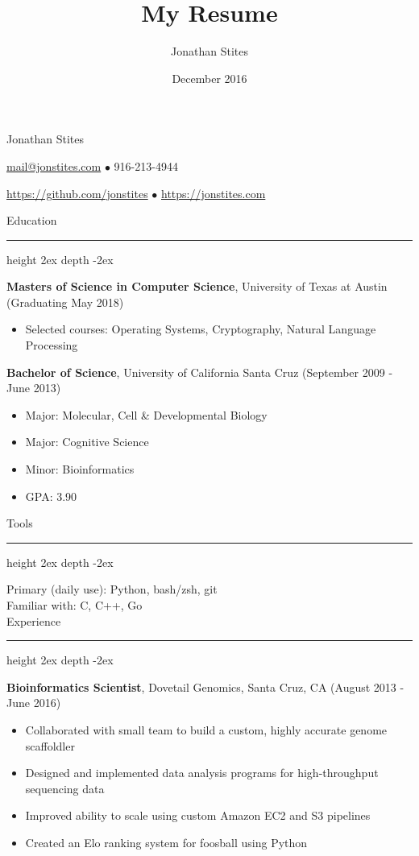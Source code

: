 \documentclass[12pt]{article}
\title{My Resume}
\author{Jonathan Stites}
\date{December 2016}
\newcommand\sectionline{\par\leavevmode\leaders\hrule height 2ex depth \dimexpr0.4pt-2ex\hfill\kern0pt\par}
\begin{document}
\begin{center}
{\LARGE Jonathan Stites}

{\href{mailto:mail+resume@jonstites.com}{mail@jonstites.com}}
$\bullet$
916-213-4944

{\href{https://github.com/jonstites}{https://github.com/jonstites}}
$\bullet$
{\href{https://jonstites.com}{https://jonstites.com}}
\end{center}

{\Large Education}\sectionline

\textbf{Masters of Science in Computer Science}, University of Texas at Austin (Graduating May 2018)
\begin{itemize}    
\setlength{\itemindent}{2em}
    \item[] Selected courses: Operating Systems, Cryptography, Natural Language Processing
\end{itemize}

\vspace{\baselineskip}

\textbf{Bachelor of Science}, University of California Santa Cruz (September 2009 - June 2013)

\begin{itemize}
\setlength{\itemindent}{2em}
\item[] Major: Molecular, Cell \& Developmental Biology
\item[] Major: Cognitive Science
\item[] Minor: Bioinformatics
\item[] GPA: 3.90
\end{itemize}

{\Large Tools}\sectionline

    \qquad \quad Primary (daily use): Python, bash/zsh, git \\

    \qquad \quad Familiar with: C, C++, Go \\

{\Large Experience}\sectionline

\textbf{Bioinformatics Scientist}, Dovetail Genomics, Santa Cruz, CA (August 2013 - June 2016)

\begin{itemize}
\setlength{\itemindent}{2em}
\item[] Collaborated with small team to build a custom, highly accurate genome scaffoldler
\item[] Designed and implemented data analysis programs for high-throughput sequencing data
\item[] Improved ability to scale using custom Amazon EC2 and S3 pipelines
\item[] Created an Elo ranking system for foosball using Python
\end{itemize}
\end{document}
